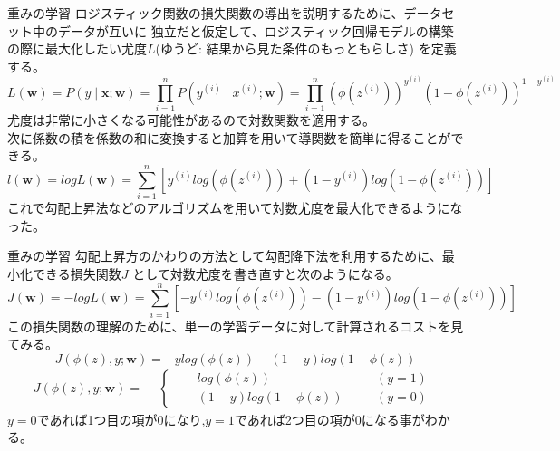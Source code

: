 \documentclass[aspectratio=169, dvipdfmx, 11pt]{beamer} %
\begin{document}
\begin{frame}{重みの学習}
    ロジスティック関数の損失関数の導出を説明するために、データセット中のデータが互いに
    独立だと仮定して、ロジスティック回帰モデルの構築の際に最大化したい尤度\(L\)(ゆうど: 結果から見た条件のもっともらしさ)
    を定義する。
    \begin{equation*}
        L(\textbf{w}) = P(y \mid \textbf{x};\textbf{w})
        = \prod_{i=1}^n P(y^{(i)} \mid x^{(i)};\textbf{w})
        = \prod_{i=1}^n (\phi (z^{(i)}))^{y^{(i)}} (1-\phi (z^{(i)}))^{1-y^{(i)}}
    \end{equation*}
    尤度は非常に小さくなる可能性があるので対数関数を適用する。\\
    次に係数の積を係数の和に変換すると加算を用いて導関数を簡単に得ることができる。
    \begin{equation*}
        l(\textbf{w}) = logL(\textbf{w})
        = \sum_{i=1}^{n} [y^{(i)} log(\phi (z^{(i)})) + (1-y^{(i)})log(1-\phi (z^{(i)}))]
    \end{equation*}
    これで勾配上昇法などのアルゴリズムを用いて対数尤度を最大化できるようになった。
\end{frame}

\begin{frame}{重みの学習}
    勾配上昇方のかわりの方法として勾配降下法を利用するために、最小化できる損失関数\(J\)
    として対数尤度を書き直すと次のようになる。
    \begin{equation*}
        J(\textbf{w}) = -logL(\textbf{w})
        = \sum_{i=1}^{n} [-y^{(i)} log(\phi (z^{(i)})) - (1-y^{(i)})log(1-\phi (z^{(i)}))]
    \end{equation*}
    この損失関数の理解のために、単一の学習データに対して計算されるコストを見てみる。
    \begin{equation*}
        J(\phi (z), y;\textbf{w}) = -y log(\phi (z)) - (1-y)log(1-\phi (z))
    \end{equation*}
    \begin{equation*}
        J(\phi (z), y;\textbf{w}) = 
        \begin{aligned}
            & \left\{ \,
                \begin{aligned}
                    & - log(\phi (z)) & \quad &(y=1) \\
                    & - (1-y)log(1-\phi (z)) & \quad &(y=0)
                \end{aligned}
            \right.
        \end{aligned}
    \end{equation*}
    \(y=0\)であれば1つ目の項が0になり,\(y=1\)であれば2つ目の項が0になる事がわかる。
\end{frame}
\end{document}

